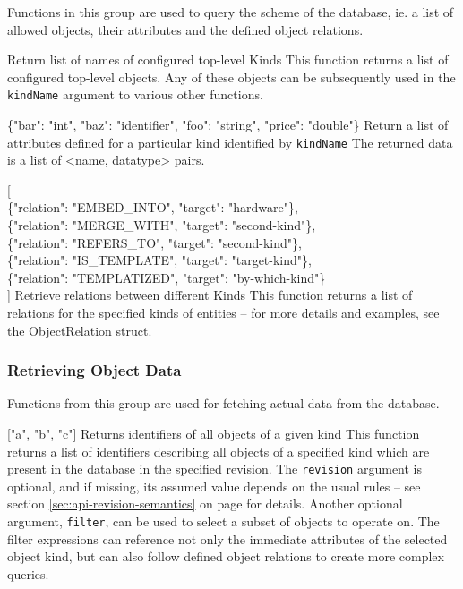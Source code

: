 \documentclass{article}
\begin{document}
Functions in this group are used to query the scheme of the database, ie. a list of allowed objects, their attributes
and the defined object relations.

    {Return list of names of configured top-level Kinds}
    {This function returns a list of configured top-level objects.  Any of these objects can be subsequently used in the
    {\tt kindName} argument to various other functions.  \deskaUnsortedRes}

    {\{"bar": "int", "baz": "identifier", "foo": "string", "price": "double"\}}
    {Return a list of attributes defined for a particular kind identified by {\tt kindName}}
    {The returned data is a list of \textless name, datatype\textgreater { }pairs.  \deskaUnsortedRes}

    { [ \\
            \{"relation": "EMBED\_INTO", "target": "hardware"\}, \\
            \{"relation": "MERGE\_WITH", "target": "second-kind"\}, \\
            \{"relation": "REFERS\_TO", "target": "second-kind"\}, \\
            \{"relation": "IS\_TEMPLATE", "target": "target-kind"\}, \\
            \{"relation": "TEMPLATIZED", "target": "by-which-kind"\} \\
            ]}
    {Retrieve relations between different Kinds}
    {This function returns a list of relations for the specified kinds of entities -- for more details and examples, see
    the ObjectRelation struct.  \deskaUnsortedRes}

\subsubsection{Retrieving Object Data}
\label{sec:api-group-data-retrieval}

Functions from this group are used for fetching actual data from the database.

    { ["a", "b", "c"] }
    {Returns identifiers of all objects of a given kind}
    {This function returns a list of identifiers describing all objects of a specified kind which are present in the
    database in the specified revision.  The {\tt revision} argument is optional, and if missing, its assumed value
    depends on the usual rules -- see section \ref{sec:api-revision-semantics} on page
    \pageref{sec:api-revision-semantics} for details.  Another optional argument, {\tt filter}, can be used to select
    a subset of objects to operate on.  The filter expressions can reference not only the immediate attributes of the
    selected object kind, but can also follow defined object relations to create more complex queries.  \deskaUnsortedRes}
\end{document}
